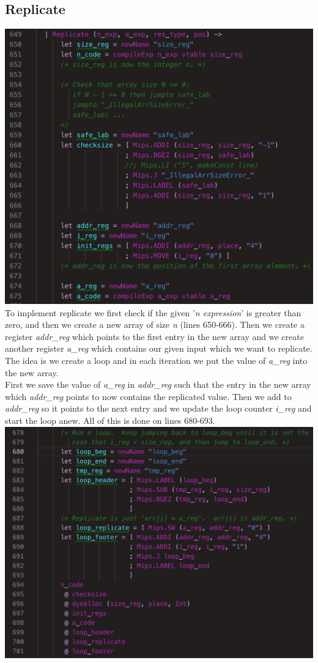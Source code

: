 \subsection{Replicate}
\includegraphics[width=\linewidth]{Materials/CodeGen/ReplicateIntro}
To implement replicate we first check if the given '\textit{n expression}' is greater than zero, and then we create a new array of size \textit{n} (lines 650-666). Then we create a register \textit{addr\_reg} which points to the first entry in the new array and we create another register \textit{a\_reg} which contains our given input which we want to replicate.\\
The idea is we create a loop and in each iteration we put the value of \textit{a\_reg} into the new array.\\
First we save the value of \textit{a\_reg} in \textit{addr\_reg} such that the entry in the new array which \textit{addr\_reg} points to now contains the replicated value. Then we add to \textit{addr\_reg} so it points to the next entry and we update the loop counter \textit{i\_reg} and start the loop anew. All of this is done on lines 680-693.\\
\includegraphics[width=\linewidth]{Materials/CodeGen/Replicate1}
